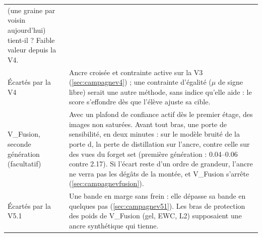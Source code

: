 \documentclass[11pt,a4paper]{article}
\begin{document}
\begin{table}[ht]
\begin{tabularx}{\linewidth}{@{}>{\raggedright}p{4.2cm}X@{}}
      (une graine par voisin aujourd'hui) tient-il ? Faible valeur depuis la V4.\\
    Écartés par la V4 & Ancre croisée et contrainte active sur la V3 (\cref{sec:campagnev4}) ; une
      contrainte d'égalité ($\mu$ de signe libre) serait une autre méthode, sans indice qu'elle aide :
      le score s'effondre dès que l'élève ajuste sa cible.\\
    V\_Fusion, seconde génération (facultatif) & Avec un plafond de confiance actif dès le premier
      étage, des images non saturées. Avant tout bras, une porte de sensibilité, en deux minutes : sur le
      modèle bruité de la porte d, la perte de distillation sur l'ancre, contre celle sur des vues du
      forget set (première génération : \numrange{0.04}{0.06} contre \num{2.17}). Si l'écart reste
      d'un ordre de grandeur, l'ancre ne verra pas les dégâts de la montée, et V\_Fusion s'arrête
      (\cref{sec:campagnevfusion}).\\
    Écartés par la V5.1 & Une bande en marge sans frein : elle dépasse sa bande en quelques pas
      (\cref{sec:campagnev51}). Les bras de protection des poids de V\_Fusion (gel, EWC, L2)
      supposaient une ancre synthétique qui tienne.\\
    \bottomrule
  \end{tabularx}
\end{table}
\end{document}
